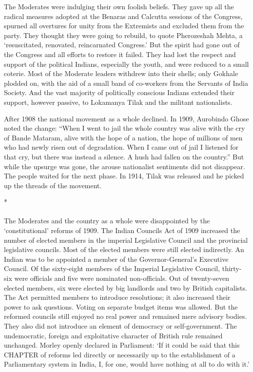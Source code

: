 \begin{multicols}{2}
The Moderates were indulging their own foolish beliefs. They gave up all the radical measures adopted at the Benaras and Calcutta sessions of the Congress, spurned all overtures for unity from the Extremists and excluded them from the party. They thought they were going to rebuild, to quote Pherozeshah Mehta, a `resuscitated, renovated, reincarnated Congress.' But the spirit had gone out of the Congress and all efforts to restore it failed. They had lost the respect and support of the political Indians, especially the youth, and were reduced to a small coterie. Most of the Moderate leaders withdrew into their shells; only Gokhale plodded on, with the aid of a small band of co-workers from the Servants of India Society. And the vast majority of politically conscious Indians extended their support, however passive, to Lokamanya Tilak and the militant nationalists.

After 1908 the national movement as a whole declined. In 1909, Aurobindo Ghose noted the change: ``When I went to jail the whole country was alive with the cry of Bande Mataram, alive with the hope of a nation, the hope of millions of men who had newly risen out of degradation. When I came out of jail I listened for that cry, but there was instead a silence. A hush had fallen on the country.'' But while the upsurge was gone, the arouse nationalist sentiments did not disappear. The people waited for the next phase. In 1914, Tilak was released and he picked up the threads of the movement.

\begin{center}*\end{center}

\paragraph*{}

The Moderates and the country as a whole were disappointed by the `constitutional' reforms of 1909. The Indian Councils Act of 1909 increased the number of elected members in the imperial Legislative Council and the provincial legislative councils. Most of the elected members were still elected indirectly. An Indian was to be appointed a member of the Governor-General's Executive Council. Of the sixty-eight members of the Imperial Legislative Council, thirty-six were officials and five were nominated non-officials. Out of twenty-seven elected members, six were elected by big landlords and two by British capitalists. The Act permitted members to introduce resolutions; it also increased their power to ask questions. Voting on separate budget items was allowed. But the reformed councils still enjoyed no real power and remained mere advisory bodies. They also did not introduce an element of democracy or self-government. The undemocratic, foreign and exploitative character of British rule remained unchanged. Morley openly declared in Parliament: `If it could be said that this CHAPTER of reforms led directly or necessarily up to the establishment of a Parliamentary system in India, I, for one, would have nothing at all to do with it.'


\end{multicols}
